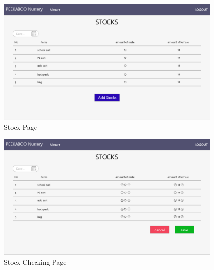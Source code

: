 \begin{figure}
  \begin{center}
  \includegraphics[width=\linewidth]{images/stockPage.png}
  \end{center}
  \caption[Poem]{Stock Page}
  \label{fig:Stock}
  \end{figure}

\begin{figure}
  \begin{center}
  \includegraphics[width=\linewidth]{images/stockPageChecking.png}
  \end{center}
  \caption[Poem]{Stock Checking Page}
  \label{fig:CheckStock}
  \end{figure}

